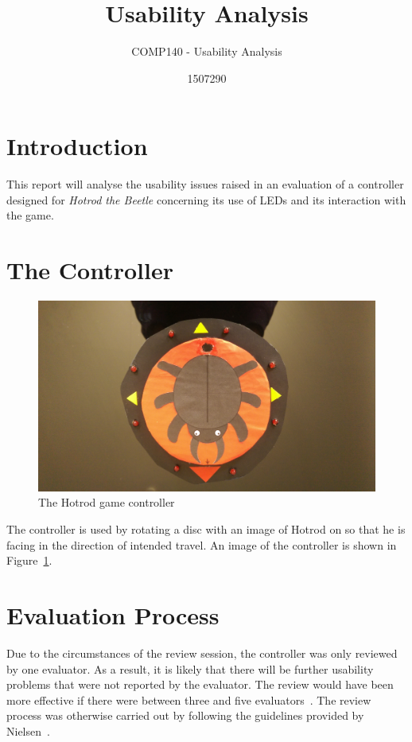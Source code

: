 \documentclass{scrartcl}
\title{Usability Analysis}
\subtitle{COMP140 - Usability Analysis}
\author{1507290}
\begin{document}
\maketitle

\abstract{}
\section{Introduction}
This report will analyse the usability issues raised in an evaluation of a controller designed for \textit{Hotrod the Beetle} concerning its use of LEDs and its interaction with the game.

\section{The Controller}
\begin{figure}[h]
\includegraphics[width=\textwidth]{controller.jpg}
\caption{The Hotrod game controller}
\label{fig:controller}
\end{figure} 
The controller is used by rotating a disc with an image of Hotrod on so that he is facing in the direction of intended travel. An image of the controller is shown in Figure~\ref{fig:controller}.


\section{Evaluation Process}
Due to the circumstances of the review session, the controller was only reviewed by one evaluator. As a result, it is likely that there will be further usability problems that were not reported by the evaluator. The review would have been more effective if there were between three and five evaluators~\cite{nielsen:evaluation}. The review process was otherwise carried out by following the guidelines provided by Nielsen~\cite{nielsen:how}.
\end{document}
